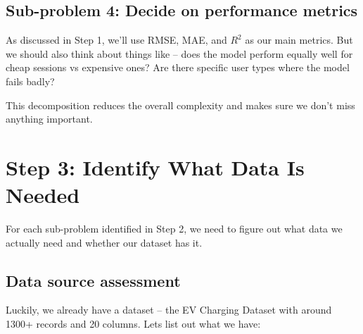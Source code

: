 \documentclass[12pt, a4paper]{article}
\begin{document}
\subsection{Sub-problem 4: Decide on performance metrics}

As discussed in Step 1, we'll use RMSE, MAE, and $R^2$ as our main metrics. But we should also think about things like -- does the model perform equally well for cheap sessions vs expensive ones? Are there specific user types where the model fails badly?

This decomposition reduces the overall complexity and makes sure we don't miss anything important.

\newpage

\section{Step 3: Identify What Data Is Needed}

For each sub-problem identified in Step 2, we need to figure out what data we actually need and whether our dataset has it.

\subsection{Data source assessment}

Luckily, we already have a dataset -- the EV Charging Dataset with around 1300+ records and 20 columns. Lets list out what we have:
\end{document}
